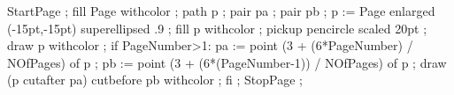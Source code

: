



StartPage ;
	fill Page withcolor  ;
	path p ; pair pa ; pair pb ;
	p := Page enlarged (-15pt,-15pt) superellipsed .9 ;
	fill p withcolor  ;
	pickup pencircle scaled 20pt ;
	draw p withcolor  ;
	if PageNumber>1:
		pa := point (3 + (6*PageNumber) / NOfPages) of p ;
		pb := point (3 + (6*(PageNumber-1)) / NOfPages) of p ; 
		draw (p cutafter pa) cutbefore pb withcolor  ;
	fi ;
StopPage ;
\stopuseMPgraphic 




\lecback{\setuplayout[header=1.5cm]\setupbackgrounds[page][background={lecbackground,slidetitle}]}
\titback{\setuplayout[header=0cm]\setupbackgrounds[page][background=lecbackground]}
\picback{\setuplayout[header=0cm]\setupbackgrounds[page][background={lecbackground,slidetitle}]}
\noback{\setupbackgrounds[page][background=nobackground]}


\setupcombinations[distance=0cm]


\setupitemize[1][color=ellipse]

\protect
\stopmodule

\endinput

